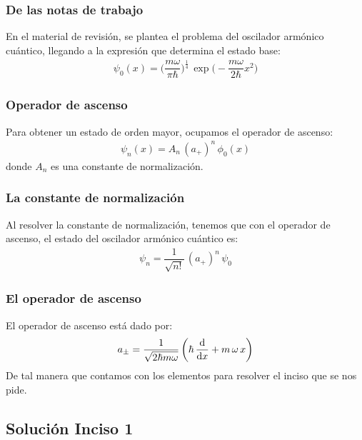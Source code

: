 \documentclass[12pt]{beamer}
\begin{document}
\begin{frame}
\frametitle{De las notas de trabajo}
En el material de revisión, se plantea el problema del oscilador armónico cuántico, llegando a la expresión que determina el estado base:
\begin{align*}
\psi_{0} (x) = \bigg( \dfrac{m \omega}{\pi \hbar} \bigg)^{\frac{1}{4}} \, \exp\bigg(- \dfrac{m \omega}{2 \hbar} x^{2} \bigg)
\end{align*}
\end{frame}
\begin{frame}
\frametitle{Operador de ascenso}
Para obtener un estado de orden mayor, ocupamos el operador de ascenso:
\pause
\begin{align*}
\psi_{n} (x) = A_{n} \, (a_{+})^{n} \, \phi_{0} (x)
\end{align*}
donde $A_{n}$ es una constante de normalización.
\end{frame}
\begin{frame}
\frametitle{La constante de normalización}
Al resolver la constante de normalización, tenemos que con el operador de ascenso, el estado del oscilador armónico cuántico es:
\pause
\begin{align*}
\psi_{n} = \dfrac{1}{\sqrt{n!}} \, (a_{+})^{n} \, \psi_{0}
\end{align*}
\end{frame}
\begin{frame}
\frametitle{El operador de ascenso}
El operador de ascenso está dado por:
\pause
\begin{align*}
a_{\pm} = \dfrac{1}{\sqrt{2 \hbar m \omega}} \, \bigg( \hbar \, \dv{x} + m \, \omega \, x \bigg)
\end{align*}
\pause
De tal manera que contamos con los elementos para resolver el inciso que se nos pide.
\end{frame}

\subsection{Solución Inciso 1}
\end{document}
